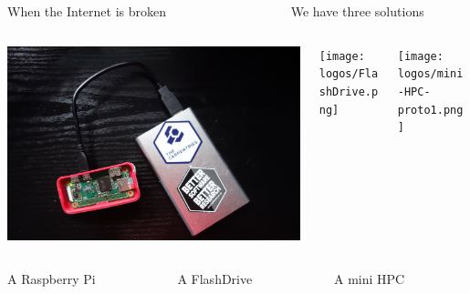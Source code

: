 \documentclass{beamer}
\begin{document}
\begin{frame}
\begin{columns}
\begin{column}{\textwidth}
			\end{column}
		\end{columns}
		\begin{columns}
			\begin{column}{.45\textwidth}
				\centering
				When the Internet is broken	
			\end{column}
			\begin{column}{.1\textwidth}
			\end{column}
			\begin{column}{.45\textwidth}
				\centering
				We have three solutions
			\end{column}
		\end{columns}
		\begin{columns}
			\begin{column}{\textwidth}

			\end{column}
		\end{columns}
		\begin{columns}
			\begin{column}{.33\textwidth}
				\centering
				\includegraphics[width=.92\columnwidth]{logos/CarpentriesOfflinePhoto.png}
			\end{column}
			\begin{column}{.33\textwidth}
				\centering
				\texttt{[image: logos/FlashDrive.png]}				
			\end{column}
			\begin{column}{.33\textwidth}
				\centering
				\texttt{[image: logos/mini-HPC-proto1.png]}
			\end{column}
		\end{columns}
		\begin{columns}
			\begin{column}{.33\textwidth}
				\centering
				A Raspberry Pi
			\end{column}
			\begin{column}{.33\textwidth}
				\centering
				A FlashDrive
			\end{column}
			\begin{column}{.33\textwidth}
				\centering
 					A mini HPC
			\end{column}
		\end{columns}		
	\end{frame}
\end{document}
